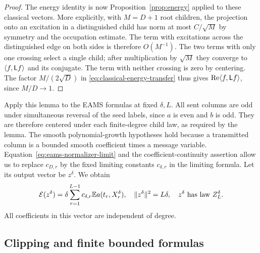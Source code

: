 \begin{proof}
The energy identity is now Proposition~\ref{prop:energy} applied to
these classical vectors.  More explicitly, with $M=D+1$ root
children, the projection onto an excitation in a distinguished child
has norm at most $C/\sqrt M$ by symmetry and the occupation estimate.
The term with excitations across the distinguished edge on both sides
is therefore $O(M^{-1})$.  The two terms with only one crossing
select a single child; after multiplication by $\sqrt M$ they
converge to $\langle f,\mathsf L f\rangle$ and its conjugate.  The term with
neither crossing is zero by centering.  The factor
$M/(2\sqrt D)$ in \eqref{eq:classical-energy-transfer} thus gives
$\operatorname{Re}\langle f,\mathsf L f\rangle$, since $M/D\to1$.
\end{proof}

Apply this lemma to the EAMS formulas at fixed $\delta,L$.
All sent columns are odd under simultaneous reversal of the seed
labels, since $a$ is even and $b$ is odd. They are therefore centered
under each finite-degree child law, as required by the lemma.
The smooth polynomial-growth hypotheses hold because a transmitted
column is a bounded smooth coefficient times a message
variable.  Equation~\eqref{eq:eams-normalizer-limit} and the
coefficient-continuity assertion allow us to replace $c_{D,r}$ by the
fixed limiting constants $c_{\delta,r}$ in the limiting formula.
Let its output vector be $z^\delta$.  We obtain
\begin{equation}
 \mathcal E(z^\delta)=\delta\sum_{r=1}^{L-1}
                    c_{\delta,r}\mathbb E a(t_r,X^\delta_r),
 \quad
 \lVert z^\delta\rVert^2=L\delta,
 \quad
 z^\delta\ \hbox{has law }Z^\delta_L.
 \label{eq:classical-eams-vector}
\end{equation}
All coefficients in this vector are independent of degree.

\subsection{Clipping and finite bounded formulas}

